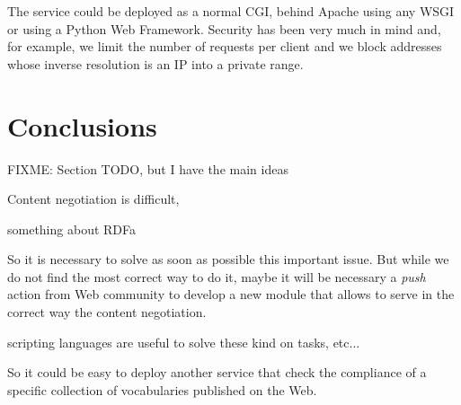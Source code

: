 The service could be deployed as a normal CGI, behind Apache using any WSGI or
using a Python Web Framework. Security has been very much in mind and, for example, 
we limit the number of requests per client and we block addresses whose inverse 
resolution is an IP into a private range.

\section{\label{sec:conclusions}Conclusions}

FIXME: Section TODO, but I have the main ideas

Content negotiation is difficult,

something about RDFa~\cite{Birbeck2006}

So it is necessary to solve as soon as possible this important issue. %
But while we do not find the most correct way to do it, maybe it will be 
necessary a \textit{push} action from Web community to develop a new
module that allows to serve in the correct way the content negotiation.

scripting languages are useful to solve these kind on tasks, etc... 

So it could be easy 
to deploy another service that check the compliance of a specific collection 
of vocabularies published on the Web.




